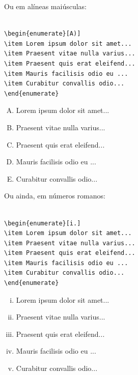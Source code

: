 \documentclass[12pt,A4,A4pt]{article}
\begin{document}
{Ou em alíneas maiúsculas:

\begin{verbatim}
    
\begin{enumerate}[A)]
\item Lorem ipsum dolor sit amet...
\item Praesent vitae nulla varius...
\item Praesent quis erat eleifend...
\item Mauris facilisis odio eu ...
\item Curabitur convallis odio...
\end{enumerate}

\end{verbatim}

\begin{enumerate}[A)]   
\item Lorem ipsum dolor sit amet...
\item Praesent vitae nulla varius...
\item Praesent quis erat eleifend...
\item Mauris facilisis odio eu ...
\item Curabitur convallis odio...
\end{enumerate}

Ou ainda, em números romanos:

\begin{verbatim}
    
\begin{enumerate}[i.]
\item Lorem ipsum dolor sit amet...
\item Praesent vitae nulla varius...
\item Praesent quis erat eleifend...
\item Mauris facilisis odio eu ...
\item Curabitur convallis odio...
\end{enumerate}

\end{verbatim}

\begin{enumerate}[i.]
\item Lorem ipsum dolor sit amet...
\item Praesent vitae nulla varius...
\item Praesent quis erat eleifend...
\item Mauris facilisis odio eu ...
\item Curabitur convallis odio...
\end{enumerate}

}
\end{document}
